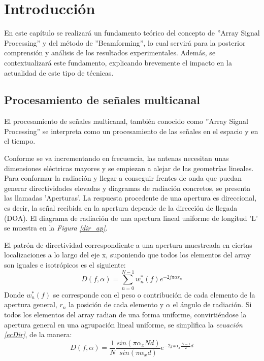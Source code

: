 \documentclass[a4paper,11pt]{book}
\begin{document}


\frontmatter
\tableofcontents
%
\mainmatter
\setlength{\parskip}{5pt}

\chapter{Introducción}
En este capítulo se realizará un fundamento teórico del concepto de ''Array Signal Processing'' y del método de ''Beamforming'', lo cual servirá para la posterior comprensión y análisis de los resultados experimentales. Además, se contextualizará este fundamento, explicando brevemente el impacto en la actualidad de este tipo de técnicas.
	\section{Procesamiento de señales multicanal}
	El procesamiento de señales multicanal, también conocido como ''Array Signal Processing'' se interpreta como un procesamiento de las señales en el espacio y en el tiempo.
	
	Conforme se va incrementando en frecuencia, las antenas necesitan unas dimensiones eléctricas mayores y se empiezan a alejar de las geometrías lineales. Para conformar la radiación y llegar a conseguir frentes de onda que puedan generar directividades elevadas y diagramas de radiación concretos, se presenta las llamadas 'Aperturas'. La respuesta procedente de una apertura es direccional, es decir, la señal recibida en la apertura depende de la dirección de llegada (DOA). El diagrama de radiación de una apertura lineal uniforme de longitud 'L' se muestra en la \textit{Figura \ref{dir_ap}}.
	
	El patrón de directividad correspondiente a una apertura muestreada en ciertas localizaciones a lo largo del eje x, suponiendo que todos los elementos del array son iguales e isotrópicos es el siguiente:
	\begin{equation}
	 D(f, \alpha) = \sum_{n = 0}^{N-1}w^{*}_{n}(f)e^{-2j \pi \alpha r_{n}}
	 \label{ecDir}
	\end{equation}
	Donde $w^{*}_{n}(f)$ se corresponde con el peso o contribución de cada elemento de la apertura general, $r_{n}$ la posición de cada elemento y $\alpha$ el ángulo de radiación. Si todos los elementos del array radian de una forma uniforme, convirtiéndose la apertura general en una agrupación lineal uniforme, se simplifica la \textit{ecuación \ref{ecDir}}, de la manera:
	\begin{equation}
		 D(f, \alpha) =\frac{1}{N}\frac{sin(\pi \alpha_{x} N d)}{sin(\pi \alpha_{x} d)} e^{-2j \pi \alpha_{x} \frac{N-1}{2} d}
	\end{equation}
	
\end{document}
